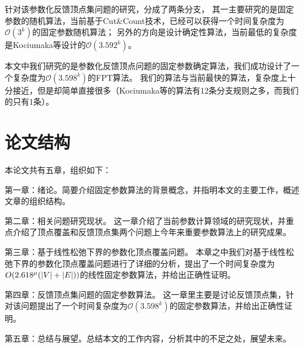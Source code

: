 针对该参数化反馈顶点集问题的研究，分成了两条分支，
其一主要研究的是固定参数的随机算法，当前基于Cut\&Count技术，已经可以获得一个时间复杂度为$\mathcal{O}(3^k)$的固定参数随机算法；
另外的方向是设计确定性算法，当前最低的复杂度是Kociumaka等设计的$\mathcal{O}(3.592^k)$。

本文中我们研究的是参数化反馈顶点问题的固定参数确定算法，我们成功设计了一个复杂度为$\mathcal{O}(3.598^k)$的FPT算法。
我们的算法与当前最快的算法，复杂度上十分接近，但是却简单直接很多（Kociumaka等的算法有12条分支规则之多，而我们的只有1条）。

\section{论文结构}
本论文共有五章，组织如下：

第一章：绪论。简要介绍固定参数算法的背景概念，并指明本文的主要工作，概述文章的组织结构。

第二章：相关问题研究现状。
这一章介绍了当前参数计算领域的研究现状，并重点介绍了顶点覆盖和反馈顶点集两个问题上今年来重要参数算法上的研究成果。

第三章：基于线性松弛下界的参数化顶点覆盖问题。
本章之中我们对基于线性松弛下界的参数化顶点覆盖问题进行了详细的分析，提出了一个时间复杂度为$O(2.618^{\mu}(\left\vert V \right\vert+\left\vert E \right\vert))$的线性固定参数算法，并给出正确性证明。

第四章：反馈顶点集问题的固定参数算法。
这一章里主要是讨论反馈顶点集，针对该问题提出了一个时间复杂度为$\mathcal{O}(3.598^k)$的固定参数算法，并给出正确性证明。

第五章：总结与展望。总结本文的工作内容，分析其中的不足之处，展望未来。

